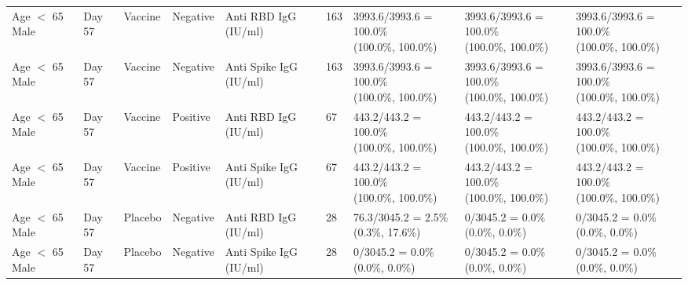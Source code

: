 \documentclass[]{book}
\theoremstyle{definition}
\theoremstyle{definition}
\theoremstyle{definition}
\newcommand{\1}{\mathbbm{1}}
\begin{document}
\begin{landscape}
\begin{ThreePartTable}
\begin{longtable}[t]{>{\raggedright\arraybackslash}p{2.7cm}llllllll}
\hspace{1em}Age $<$ 65 Male & Day 57 & Vaccine & Negative & Anti RBD IgG (IU/ml) & 163 & \makecell[l]{3993.6/3993.6 = 100.0\%\\(100.0\%, 100.0\%)} & \makecell[l]{3993.6/3993.6 = 100.0\%\\(100.0\%, 100.0\%)} & \makecell[l]{3993.6/3993.6 = 100.0\%\\(100.0\%, 100.0\%)}\\
\hspace{1em}Age $<$ 65 Male & Day 57 & Vaccine & Negative & Anti Spike IgG (IU/ml) & 163 & \makecell[l]{3993.6/3993.6 = 100.0\%\\(100.0\%, 100.0\%)} & \makecell[l]{3993.6/3993.6 = 100.0\%\\(100.0\%, 100.0\%)} & \makecell[l]{3993.6/3993.6 = 100.0\%\\(100.0\%, 100.0\%)}\\
\hspace{1em}Age $<$ 65 Male & Day 57 & Vaccine & Positive & Anti RBD IgG (IU/ml) & 67 & \makecell[l]{443.2/443.2 = 100.0\%\\(100.0\%, 100.0\%)} & \makecell[l]{443.2/443.2 = 100.0\%\\(100.0\%, 100.0\%)} & \makecell[l]{443.2/443.2 = 100.0\%\\(100.0\%, 100.0\%)}\\
\hspace{1em}Age $<$ 65 Male & Day 57 & Vaccine & Positive & Anti Spike IgG (IU/ml) & 67 & \makecell[l]{443.2/443.2 = 100.0\%\\(100.0\%, 100.0\%)} & \makecell[l]{443.2/443.2 = 100.0\%\\(100.0\%, 100.0\%)} & \makecell[l]{443.2/443.2 = 100.0\%\\(100.0\%, 100.0\%)}\\
\hspace{1em}Age $<$ 65 Male & Day 57 & Placebo & Negative & Anti RBD IgG (IU/ml) & 28 & \makecell[l]{76.3/3045.2 = 2.5\%\\(0.3\%, 17.6\%)} & \makecell[l]{0/3045.2 = 0.0\%\\(0.0\%, 0.0\%)} & \makecell[l]{0/3045.2 = 0.0\%\\(0.0\%, 0.0\%)}\\
\hspace{1em}Age $<$ 65 Male & Day 57 & Placebo & Negative & Anti Spike IgG (IU/ml) & 28 & \makecell[l]{0/3045.2 = 0.0\%\\(0.0\%, 0.0\%)} & \makecell[l]{0/3045.2 = 0.0\%\\(0.0\%, 0.0\%)} & \makecell[l]{0/3045.2 = 0.0\%\\(0.0\%, 0.0\%)}\\

\end{longtable}
\end{ThreePartTable}
\end{landscape}
\end{document}
